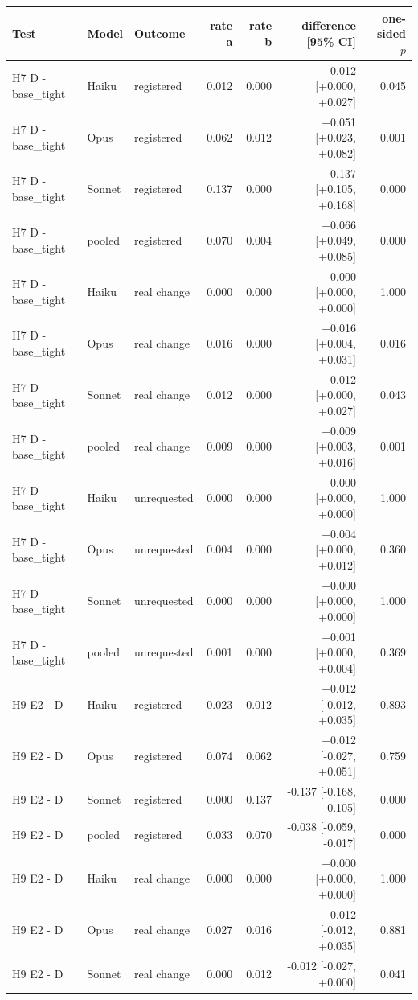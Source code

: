 \begin{tabular}{lllrrrr}
\toprule
Test & Model & Outcome & rate a & rate b & difference [95\% CI] & one-sided $p$ \\
\midrule
H7 D - base\_tight & Haiku & registered & 0.012 & 0.000 & +0.012 [+0.000, +0.027] & 0.045 \\
H7 D - base\_tight & Opus & registered & 0.062 & 0.012 & +0.051 [+0.023, +0.082] & 0.001 \\
H7 D - base\_tight & Sonnet & registered & 0.137 & 0.000 & +0.137 [+0.105, +0.168] & 0.000 \\
H7 D - base\_tight & pooled & registered & 0.070 & 0.004 & +0.066 [+0.049, +0.085] & 0.000 \\
H7 D - base\_tight & Haiku & real change & 0.000 & 0.000 & +0.000 [+0.000, +0.000] & 1.000 \\
H7 D - base\_tight & Opus & real change & 0.016 & 0.000 & +0.016 [+0.004, +0.031] & 0.016 \\
H7 D - base\_tight & Sonnet & real change & 0.012 & 0.000 & +0.012 [+0.000, +0.027] & 0.043 \\
H7 D - base\_tight & pooled & real change & 0.009 & 0.000 & +0.009 [+0.003, +0.016] & 0.001 \\
H7 D - base\_tight & Haiku & unrequested & 0.000 & 0.000 & +0.000 [+0.000, +0.000] & 1.000 \\
H7 D - base\_tight & Opus & unrequested & 0.004 & 0.000 & +0.004 [+0.000, +0.012] & 0.360 \\
H7 D - base\_tight & Sonnet & unrequested & 0.000 & 0.000 & +0.000 [+0.000, +0.000] & 1.000 \\
H7 D - base\_tight & pooled & unrequested & 0.001 & 0.000 & +0.001 [+0.000, +0.004] & 0.369 \\
H9 E2 - D & Haiku & registered & 0.023 & 0.012 & +0.012 [-0.012, +0.035] & 0.893 \\
H9 E2 - D & Opus & registered & 0.074 & 0.062 & +0.012 [-0.027, +0.051] & 0.759 \\
H9 E2 - D & Sonnet & registered & 0.000 & 0.137 & -0.137 [-0.168, -0.105] & 0.000 \\
H9 E2 - D & pooled & registered & 0.033 & 0.070 & -0.038 [-0.059, -0.017] & 0.000 \\
H9 E2 - D & Haiku & real change & 0.000 & 0.000 & +0.000 [+0.000, +0.000] & 1.000 \\
H9 E2 - D & Opus & real change & 0.027 & 0.016 & +0.012 [-0.012, +0.035] & 0.881 \\
H9 E2 - D & Sonnet & real change & 0.000 & 0.012 & -0.012 [-0.027, +0.000] & 0.041 \\

\end{tabular}
